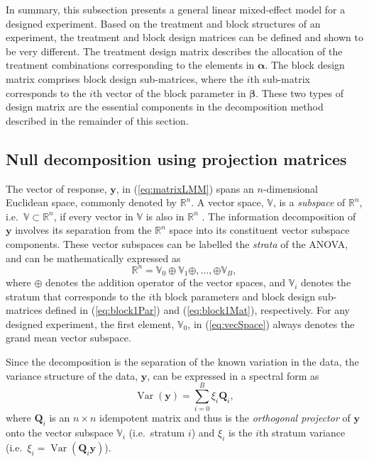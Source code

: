 \documentclass[article]{jss}
\newcommand{\Q}{\mathbf{Q}}
\begin{document}
In summary, this subsection presents a general linear mixed-effect model for a designed experiment. Based on the treatment and block structures of an experiment, the treatment and block design matrices can be defined and shown to be very different. The treatment design matrix describes the allocation of the treatment combinations corresponding to the elements in $\bm{\alpha}$. The block design matrix comprises block design sub-matrices, where the $i$th sub-matrix corresponds to the $i$th vector of the block parameter in $\bm{\beta}$. These two types of design matrix are the essential components in the decomposition method described in the remainder of this section. 

\subsection{Null decomposition using projection matrices}
\label{subsec:strataDecompProj}
The vector of response, $\bm{y}$, in (\ref{eq:matrixLMM}) spans an $n$-dimensional Euclidean space, commonly denoted by $\mathbb{R}^n$. A vector space, $\mathbb{V}$, is a \emph{subspace} of $\mathbb{R}^n$, i.e.\ $\mathbb{V} \subset \mathbb{R}^n$, if every vector in $\mathbb{V}$ is also in $\mathbb{R}^n$ \citep{Hadi1996}. The information decomposition of $\bm{y}$ involves its separation from the $\mathbb{R}^n$ space into its constituent vector subspace components. These vector subspaces can be labelled the \emph{strata} of the ANOVA, and can be mathematically expressed as 
\begin{equation}
\label{eq:vecSpace}
\mathbb{R}^n = \mathbb{V}_0 \oplus \mathbb{V}_1 \oplus, \dots , \oplus \mathbb{V}_{B},
\end{equation} 
where $\oplus$ denotes the addition operator of the vector spaces, and $\mathbb{V}_i$ denotes the stratum that corresponds to the $i$th block parameters and block design sub-matrices defined in (\ref{eq:block1Par}) and (\ref{eq:block1Mat}), respectively. For any designed experiment, the first element, $\mathbb{V}_0$, in (\ref{eq:vecSpace}) always denotes the grand mean vector subspace.  

Since the decomposition is the separation of the known variation in the data, the variance structure of the data, $\bm{y}$, can be expressed in a spectral form as
\begin{equation}
\label{eq:strata}
\operatorname{Var}(\bm{y}) = \sum_{i=0}^{B} \xi_i \Q_i,
\end{equation}
where $\Q_i$ is an $n \times n$ idempotent matrix and thus is the \emph{orthogonal projector} of $\bm{y}$ onto the vector subspace $\mathbb{V}_i$ (i.e.\ stratum $i$) and $\xi_i$ is the $i$th stratum variance (i.e.\ $\xi_i = \operatorname{Var}(\Q_i \bm{y})$).
\end{document}
